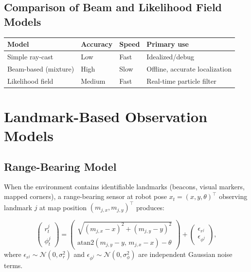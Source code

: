 \documentclass[11pt,a4paper]{article}
\theoremstyle{definition}
\theoremstyle{plain}
\theoremstyle{remark}
\begin{document}
\subsection{Comparison of Beam and Likelihood Field Models}

\begin{center}
\begin{tabular}{llll}
\hline
\textbf{Model} & \textbf{Accuracy} & \textbf{Speed} & \textbf{Primary use} \\
\hline
Simple ray-cast & Low & Fast & Idealized/debug \\
Beam-based (mixture) & High & Slow & Offline, accurate localization \\
Likelihood field & Medium & Fast & Real-time particle filter \\
\hline
\end{tabular}
\end{center}

\section{Landmark-Based Observation Models}

\subsection{Range-Bearing Model}

When the environment contains identifiable landmarks (beacons, visual markers, mapped corners), a range-bearing sensor at robot pose $x_t = (x, y, \theta)^\top$ observing landmark $j$ at map position $(m_{j,x}, m_{j,y})^\top$ produces: %

\begin{tcolorbox}[colback=blue!5!white,colframe=blue!75!black,title=\textbf{Range-Bearing Observation Model}]
\[
    \begin{pmatrix} r_t^j \\ \phi_t^j \end{pmatrix}
    =
    \begin{pmatrix}
        \sqrt{(m_{j,x} - x)^2 + (m_{j,y} - y)^2} \\[4pt] %
        \mathrm{atan2}(m_{j,y} - y,\, m_{j,x} - x) - \theta
    \end{pmatrix}
    +
    \begin{pmatrix} \epsilon_{r^j} \\ \epsilon_{\phi^j} \end{pmatrix},
\]
where $\epsilon_{r^j} \sim \mathcal{N}(0, \sigma_r^2)$ and $\epsilon_{\phi^j} \sim \mathcal{N}(0, \sigma_\phi^2)$ are independent Gaussian noise terms.
\end{tcolorbox}
\end{document}
